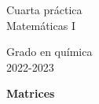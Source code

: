 \documentclass{article}
\title{\tit}
\author{}
\date{}
\def\tit{Matrices}
\begin{document}
\noindent\begin{minipage}{.4\textwidth}
\large
Cuarta práctica\\
Matemáticas I
\end{minipage}
\hfill
\begin{minipage}{.4\textwidth}
\large
\flushright
Grado en química\\
2022-2023
\end{minipage}

\bigskip

\begin{center}
\textbf{
\huge
\tit
}
\end{center}


\end{document}
